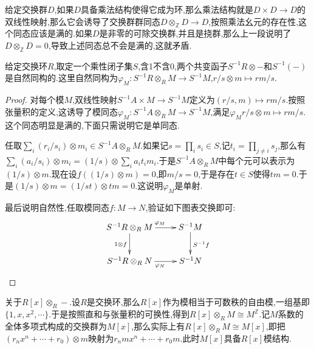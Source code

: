 给定交换群$D$,如果$D$具备乘法结构使得它成为环,那么乘法结构就是$D\times D\to D$的双线性映射,那么它会诱导了交换群群同态$D\otimes_{\mathbb{Z}}D\to D$,按照乘法幺元的存在性,这个同态应该是满的.如果$D$是非零的可除交换群,并且是挠群,那么上一段说明了$D\otimes_{\mathbb{Z}}D=0$,导致上述同态总不会是满的,这就矛盾.

给定交换环$R$,取定一个乘性闭子集$S$,含1不含0,两个共变函子$S^{-1}R\otimes-$和$S^{-1}(-)$是自然同构的.这里自然同构为$\varphi_M:S^{-1}R\otimes_RM\to S^{-1}M$,$r/s\otimes m\mapsto rm/s$.
\begin{proof}
	
	对每个模$M$,双线性映射$S^{-1}A\times M\to S^{-1}M$定义为$(r/s,m)\mapsto rm/s$.按照张量积的定义,这诱导了模同态$\varphi_M:S^{-1}A\otimes_RM\to S^{-1}M$,满足$\varphi_Mr/s\otimes m\mapsto rm/s$.这个同态明显是满的,下面只需说明它是单同态.
	
	任取$\sum_i(r_i/s_i)\otimes m_i\in S^{-1}A\otimes_RM$.如果记$s=\prod_is_i\in S$,记$t_i=\prod_{j\not=i}s_j$,那么有$\sum_i(a_i/s_i)\otimes m_i=(1/s)\otimes\sum_ia_it_im_i$.于是$S^{-1}A\otimes_RM$中每个元可以表示为$(1/s)\otimes m$.现在设$f((1/s)\otimes m)=0$,即$m/s=0$,于是存在$t\in S$使得$tm=0$.于是$(1/s)\otimes m=(1/st)\otimes tm=0$.这说明$\varphi_M$是单射.
	
	最后说明自然性,任取模同态$f:M\to N$,验证如下图表交换即可:
	$$\xymatrix{S^{-1}R\otimes_RM\ar[r]^{\varphi_M}\ar[d]_{1\otimes f}&S^{-1}M\ar[d]^{S^{-1}f}\\ S^{-1}R\otimes_RN\ar[r]_{\varphi_N}&S^{-1}N}$$
\end{proof}

关于$R[x]\otimes_R-$.设$R$是交换环,那么$R[x]$作为模相当于可数秩的自由模,一组基即$\{1,x,x^2,\cdots\}$.于是按照直和与张量积的可换性,得到$R[x]\otimes_RM\cong M^{\mathbb{Z}}$.记$M$系数的全体多项式构成的交换群为$M[x]$,那么实际上有$R[x]\otimes_RM\cong M[x]$,即把$(r_nx^n+\cdots+r_0)\otimes m$映射为$r_nmx^n+\cdots+r_0m$.此时$M[x]$具备$R[x]$模结构.

